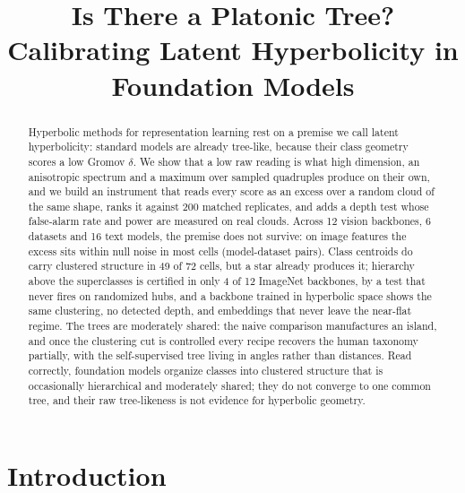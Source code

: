 \documentclass{article} %
\title{Is There a Platonic Tree? Calibrating Latent Hyperbolicity in Foundation Models}
\begin{document}
\maketitle

\begin{abstract}
Hyperbolic methods for representation learning rest on a premise we call latent hyperbolicity: standard models are already tree-like, because their class geometry scores a low Gromov $\delta$. We show that a low raw reading is what high dimension, an anisotropic spectrum and a maximum over sampled quadruples produce on their own, and we build an instrument that reads every score as an excess over a random cloud of the same shape, ranks it against 200 matched replicates, and adds a depth test whose false-alarm rate and power are measured on real clouds. Across 12 vision backbones, 6 datasets and 16 text models, the premise does not survive: on image features the excess sits within null noise in most cells (model-dataset pairs). Class centroids do carry clustered structure in 49 of 72 cells, but a star already produces it; hierarchy above the superclasses is certified in only 4 of 12 ImageNet backbones, by a test that never fires on randomized hubs, and a backbone trained in hyperbolic space shows the same clustering, no detected depth, and embeddings that never leave the near-flat regime. The trees are moderately shared: the naive comparison manufactures an island, and once the clustering cut is controlled every recipe recovers the human taxonomy partially, with the self-supervised tree living in angles rather than distances. Read correctly, foundation models organize classes into clustered structure that is occasionally hierarchical and moderately shared; they do not converge to one common tree, and their raw tree-likeness is not evidence for hyperbolic geometry.
\end{abstract}




\section{Introduction}
\label{sec:introduction}
\end{document}
